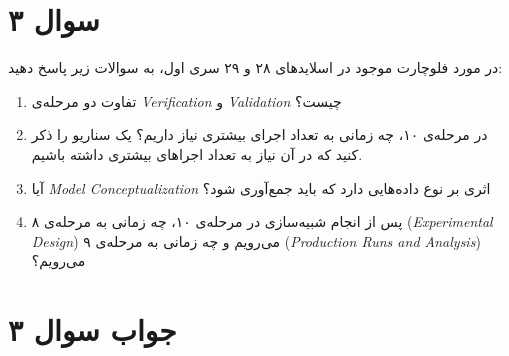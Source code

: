 \section*{سوال ۳}

در مورد فلوچارت موجود در اسلاید‌های ۲۸ و ۲۹ سری اول، به سوالات زیر پاسخ دهید:

\begin{enumerate}[الف)]
	\item تفاوت دو مرحله‌ی \textit{Verification} و \textit{Validation} چیست؟
	\item در مرحله‌ی ۱۰، چه زمانی به تعداد اجرای بیشتری نیاز داریم؟ یک سناریو را ذکر کنید که در آن نیاز به تعداد اجراهای بیشتری داشته باشیم.
	\item آیا \textit{Model Conceptualization} اثری بر نوع داده‌هایی دارد که باید جمع‌آوری شود؟
	\item پس از انجام شبیه‌سازی در مرحله‌ی ۱۰، چه زمانی به مرحله‌ی ۸ 
	(\textit{Experimental Design}) می‌رویم 
	و چه زمانی به مرحله‌ی ۹
	(\textit{Production Runs and Analysis}) می‌رویم؟
\end{enumerate}

\section*{جواب سوال ۳}



